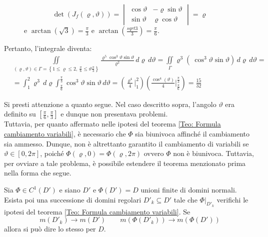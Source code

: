 \begin{example}
\begin{figure}[H]
\begin{minipage}{0.55\textwidth}
\begin{equation*}
        \det\left(J_f(\varrho, \vartheta)\right)=\begin{vmatrix}
        \cos \vartheta & -\varrho \sin\vartheta\\
        \sin \vartheta & \varrho \cos\vartheta    
        \end{vmatrix}= \varrho
    \end{equation*}
    e $\arctan(\sqrt{3})= \tfrac{\pi}{3}$ e $\arctan(\tfrac{sqrt{3}}{3})=\tfrac{\pi}{6}$.
    \end{minipage}
\end{figure}
Pertanto, l'integrale diventa:
\begin{align*}
    &\iint\limits_{(\varrho, \vartheta) \in \Gamma=\left\{ 1 \leq \varrho \leq 2,\ \frac{\pi}{6} \leq \vartheta \frac{\pi}{3}\right\}}{\frac{\varrho^5 \cos^3 \vartheta \sin \vartheta}{\varrho^2}\,d\varrho\,d\vartheta}=\iint\limits_{\Gamma}{\varrho^3\left(\ \cos^3 \vartheta \sin \vartheta \right)\, d\varrho\,d\vartheta }=\\
    &=\int_{1}^{2}{\varrho^3\, d\varrho} \int_{\frac{\pi}{6}}^{\frac{\pi}{3}}{\cos^3\vartheta \sin \vartheta \, d\vartheta} = \left(\frac{\varrho^4}{4}\Big|_{1}^{2}\right)\left(\frac{\cos^4(\vartheta)}{4}\Big|_{\frac{\pi}{6}}^\frac{\pi}{3}\right)= \frac{15}{32}
    \end{align*}
\end{example}
Si presti attenzione a quanto segue. Nel caso descritto sopra, l'angolo $\vartheta$ era definito su $\left[\tfrac{\pi}{6}, \tfrac{\pi}{3}\right]$ e dunque non presentava problemi.\\
Tuttavia, per quanto affermato nelle ipotesi del teorema \ref{Teo: Formula cambiamento variabili}, è necessario che $\Phi$ sia biunivoca affinché il cambiamento sia ammesso. Dunque, non è altrettanto garantito il cambiamento di variabili se $\vartheta \in [0, 2\pi]$, poiché $\Phi(\varrho, 0)=\Phi(\varrho, 2\pi)$ ovvero $\Phi$ non è biunivoca.
Tuttavia, per ovviare a tale problema, è possibile estendere il teorema menzionato prima nella forma che segue.
\begin{theorem}
    Sia $\Phi \in C^1(D')$ e siano $D'$ e $\Phi(D')=D$ unioni finite di domini normali. Esista poi una successione di domini regolari $D'_k \subseteq D'$ tale che $\Phi\big|_{D'_k}$ verifichi le ipotesi del teorema \ref{Teo: Formula cambiamento variabili}. Se
    \begin{equation}
        m(D'_k) \to m(D') \qquad m(\Phi(D'_k)) \to m(\Phi(D'))
    \end{equation}
    allora si può dire lo stesso per $D$.
\end{theorem}
